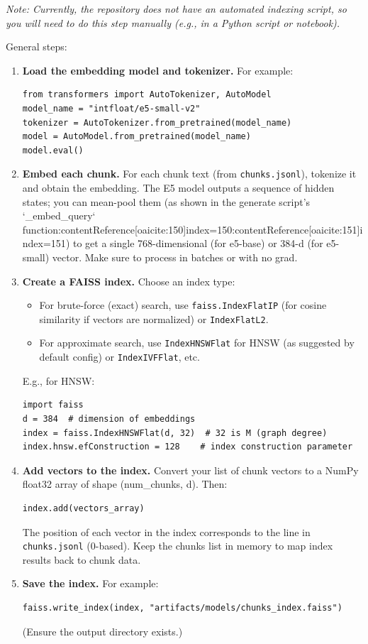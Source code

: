 \documentclass{article}
\begin{document}
\textit{Note: Currently, the repository does not have an automated indexing script, so you will need to do this step manually (e.g., in a Python script or notebook).}

General steps:
\begin{enumerate}
    \item \textbf{Load the embedding model and tokenizer.} For example:
\begin{verbatim}
from transformers import AutoTokenizer, AutoModel
model_name = "intfloat/e5-small-v2"
tokenizer = AutoTokenizer.from_pretrained(model_name)
model = AutoModel.from_pretrained(model_name)
model.eval()
\end{verbatim}
    \item \textbf{Embed each chunk.} For each chunk text (from \texttt{chunks.jsonl}), tokenize it and obtain the embedding. The E5 model outputs a sequence of hidden states; you can mean-pool them (as shown in the generate script’s `_embed_query` function:contentReference[oaicite:150]{index=150}:contentReference[oaicite:151]{index=151}) to get a single 768-dimensional (for e5-base) or 384-d (for e5-small) vector. Make sure to process in batches or with no grad.
    \item \textbf{Create a FAISS index.} Choose an index type:
        \begin{itemize}
            \item For brute-force (exact) search, use \texttt{faiss.IndexFlatIP} (for cosine similarity if vectors are normalized) or \texttt{IndexFlatL2}.
            \item For approximate search, use \texttt{IndexHNSWFlat} for HNSW (as suggested by default config) or \texttt{IndexIVFFlat}, etc.
        \end{itemize}
        E.g., for HNSW:
\begin{verbatim}
import faiss
d = 384  # dimension of embeddings
index = faiss.IndexHNSWFlat(d, 32)  # 32 is M (graph degree)
index.hnsw.efConstruction = 128    # index construction parameter
\end{verbatim}
    \item \textbf{Add vectors to the index.} Convert your list of chunk vectors to a NumPy float32 array of shape (num_chunks, d). Then:
\begin{verbatim}
index.add(vectors_array)
\end{verbatim}
        The position of each vector in the index corresponds to the line in \texttt{chunks.jsonl} (0-based). Keep the chunks list in memory to map index results back to chunk data.
    \item \textbf{Save the index.} For example:
\begin{verbatim}
faiss.write_index(index, "artifacts/models/chunks_index.faiss")
\end{verbatim}
        (Ensure the output directory exists.)
\end{enumerate}
\end{document}
